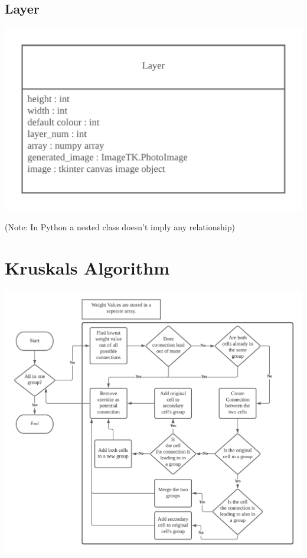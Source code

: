 \documentclass{article}
\begin{document}
\subsection{Layer}
\begin{center}
	\includegraphics[scale=1]{Layer Class}

	\color{mygrey}(Note: In Python a nested class doesn't imply any relationship)
\end{center}

\clearpage

\section{Kruskals Algorithm}

\begin{center}
	\includegraphics[scale=0.8]{Kruskals}
\end{center}
\end{document}
